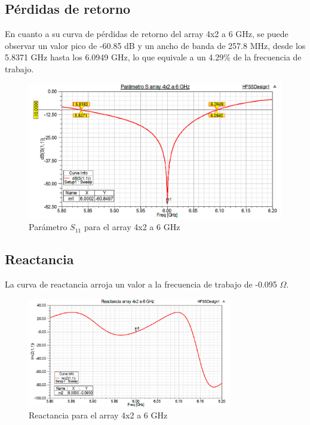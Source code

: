\subsection{Pérdidas de retorno}
\par En cuanto a su curva de pérdidas de retorno del array 4x2 a 6 GHz, se puede observar un valor pico de -60.85 dB y un ancho de banda de 257.8 MHz, desde los 5.8371 GHz hasta los 6.0949 GHz, lo que equivale a un 4.29\% de la frecuencia de trabajo.
\\
\begin{figure}[H]
    \centering
        \includegraphics[width=\textwidth]{archivos/analisis/4x22/1}
        \caption{Parámetro $S_{11}$ para el array 4x2 a 6 GHz}
        \label{fig:s4x22}
\end{figure}

\newpage
\subsection{Reactancia}
\par La curva de reactancia arroja un valor a la frecuencia de trabajo de -0.095 $\Omega$. 
\\
\begin{figure}[H]
    \centering
        \includegraphics[width=0.8\textwidth]{archivos/analisis/4x22/2}
        \caption{Reactancia para el array 4x2 a 6 GHz}
        \label{fig:react4x22}
\end{figure}

